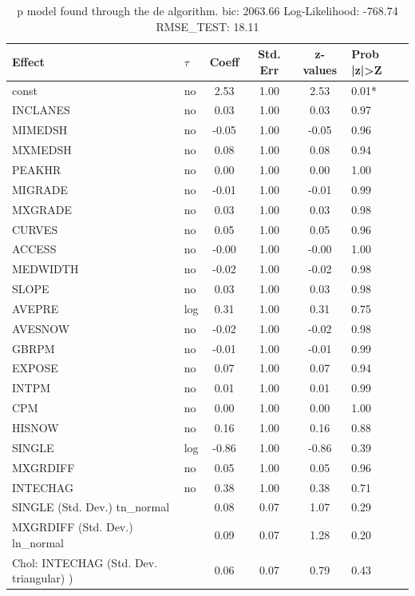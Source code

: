 \begin{table}
	\caption{p model found through the de algorithm. bic: 2063.66 Log-Likelihood: -768.74 RMSE_TEST: 18.11}
	\begin{center}
		\begin{tabular}{|l|l|c|c|c|l|}
			\hline
			Effect & $\tau$ & Coeff & Std. Err & z-values & Prob |z|>Z \\
			\hline
			const & no & 2.53 & 1.00 & 2.53 & 0.01* \\
			\hline
			INCLANES & no & 0.03 & 1.00 & 0.03 & 0.97 \\
			\hline
			MIMEDSH & no & -0.05 & 1.00 & -0.05 & 0.96 \\
			\hline
			MXMEDSH & no & 0.08 & 1.00 & 0.08 & 0.94 \\
			\hline
			PEAKHR & no & 0.00 & 1.00 & 0.00 & 1.00 \\
			\hline
			MIGRADE & no & -0.01 & 1.00 & -0.01 & 0.99 \\
			\hline
			MXGRADE & no & 0.03 & 1.00 & 0.03 & 0.98 \\
			\hline
			CURVES & no & 0.05 & 1.00 & 0.05 & 0.96 \\
			\hline
			ACCESS & no & -0.00 & 1.00 & -0.00 & 1.00 \\
			\hline
			MEDWIDTH & no & -0.02 & 1.00 & -0.02 & 0.98 \\
			\hline
			SLOPE & no & 0.03 & 1.00 & 0.03 & 0.98 \\
			\hline
			AVEPRE & log & 0.31 & 1.00 & 0.31 & 0.75 \\
			\hline
			AVESNOW & no & -0.02 & 1.00 & -0.02 & 0.98 \\
			\hline
			GBRPM & no & -0.01 & 1.00 & -0.01 & 0.99 \\
			\hline
			EXPOSE & no & 0.07 & 1.00 & 0.07 & 0.94 \\
			\hline
			INTPM & no & 0.01 & 1.00 & 0.01 & 0.99 \\
			\hline
			CPM & no & 0.00 & 1.00 & 0.00 & 1.00 \\
			\hline
			HISNOW & no & 0.16 & 1.00 & 0.16 & 0.88 \\
			\hline
			SINGLE & log & -0.86 & 1.00 & -0.86 & 0.39 \\
			\hline
			MXGRDIFF & no & 0.05 & 1.00 & 0.05 & 0.96 \\
			\hline
			INTECHAG & no & 0.38 & 1.00 & 0.38 & 0.71 \\
			\hline
			SINGLE (Std. Dev.) tn_normal &  & 0.08 & 0.07 & 1.07 & 0.29 \\
			\hline
			MXGRDIFF (Std. Dev.) ln_normal &  & 0.09 & 0.07 & 1.28 & 0.20 \\
			\hline
			 Chol: INTECHAG (Std. Dev. triangular) ) &  & 0.06 & 0.07 & 0.79 & 0.43 \\
			\hline
		\end{tabular}
	\end{center}
\end{table}